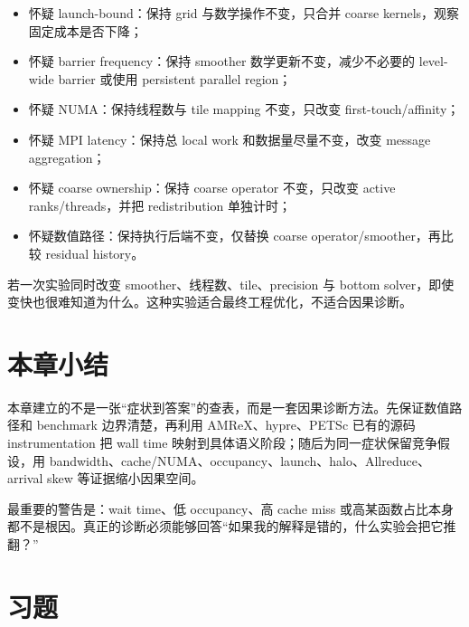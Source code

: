 \begin{itemize}
\item 怀疑 launch-bound：保持 grid 与数学操作不变，只合并 coarse kernels，观察固定成本是否下降；
\item 怀疑 barrier frequency：保持 smoother 数学更新不变，减少不必要的 level-wide barrier 或使用 persistent parallel region；
\item 怀疑 NUMA：保持线程数与 tile mapping 不变，只改变 first-touch/affinity；
\item 怀疑 MPI latency：保持总 local work 和数据量尽量不变，改变 message aggregation；
\item 怀疑 coarse ownership：保持 coarse operator 不变，只改变 active ranks/threads，并把 redistribution 单独计时；
\item 怀疑数值路径：保持执行后端不变，仅替换 coarse operator/smoother，再比较 residual history。
\end{itemize}

若一次实验同时改变 smoother、线程数、tile、precision 与 bottom solver，即使变快也很难知道为什么。这种实验适合最终工程优化，不适合因果诊断。

\section{本章小结}
本章建立的不是一张“症状到答案”的查表，而是一套因果诊断方法。先保证数值路径和 benchmark 边界清楚，再利用 AMReX、hypre、PETSc 已有的源码 instrumentation 把 wall time 映射到具体语义阶段；随后为同一症状保留竞争假设，用 bandwidth、cache/NUMA、occupancy、launch、halo、Allreduce、arrival skew 等证据缩小因果空间。

最重要的警告是：wait time、低 occupancy、高 cache miss 或高某函数占比本身都不是根因。真正的诊断必须能够回答“如果我的解释是错的，什么实验会把它推翻？”

\section*{习题}

